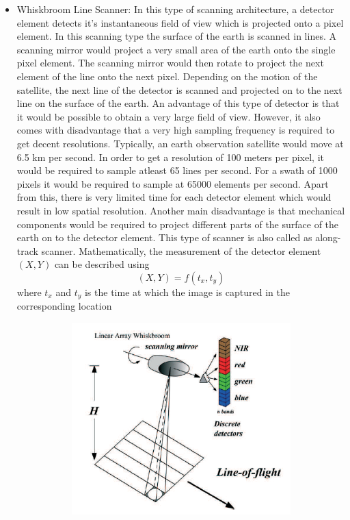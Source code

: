 \begin{itemize}
\item Whiskbroom Line Scanner: In this type of scanning architecture, a detector element detects it's instantaneous field of view which is projected onto a pixel element. In this scanning type the surface of the earth is scanned in lines. A scanning mirror would project a very small area of the earth onto the single pixel element. The scanning mirror would then rotate to project the next element of the line onto the next pixel. Depending on the motion of the satellite, the next line of the detector is scanned and projected on to the next line on the surface of the earth. An advantage of this type of detector is that it would be possible to obtain a very large field of view. However, it also comes with disadvantage that a very high sampling frequency is required to get decent resolutions. Typically, an earth observation satellite would move at 6.5 km per second. In order to get a resolution of 100 meters per pixel, it would be required to sample atleast 65 lines per second. For a swath of 1000 pixels it would be required to sample at 65000 elements per second. Apart from this, there is very limited time for each detector element which would result in low spatial resolution\cite{SpInst}. Another main disadvantage is that mechanical components would be required to project different parts of the surface of the earth on to the detector element. This type of scanner is also called as along-track scanner. Mathematically, the measurement of the detector element $(X,Y)$ can be described using 
$$
(X,Y) = f(t_x, t_y)
$$
where $t_x$ and $t_y$ is the time at which the image is captured in the corresponding location
\begin{figure}[ht]
\centering
\begin{subfigure}{0.75\textwidth}
  \centering
  \includegraphics[width=.5\linewidth]{pics/WhiskBroom}

\end{subfigure}
\end{figure}
\end{itemize}
